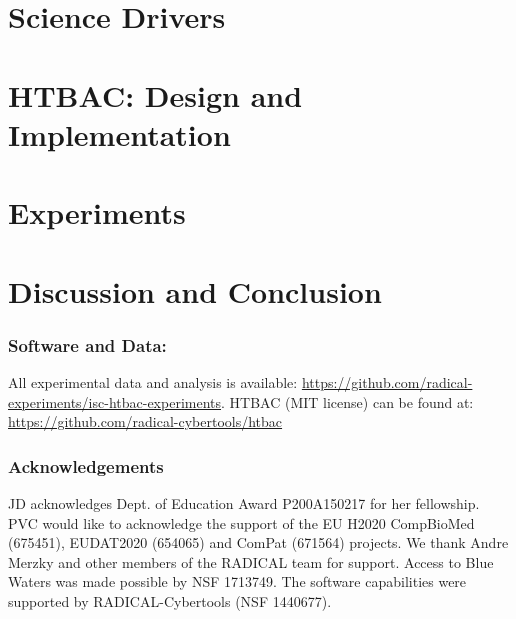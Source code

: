 \documentclass{llncs}
\begin{document}
\section{Science Drivers}
\label{sec:science-drivers}



\section{HTBAC: Design and Implementation}


\vspace{-0.2in}

\section{Experiments}


%

\vspace{-0.2in}

\section{Discussion and Conclusion}


\vspace{-0.2in}

\subsubsection{Software and Data: }
{\footnotesize All experimental data and analysis is available: 
\url{https://github.com/radical-experiments/isc-htbac-experiments}. 
HTBAC (MIT license) can be found at:
\url{https://github.com/radical-cybertools/htbac}}

\vspace{-0.2in}

\subsubsection{Acknowledgements}
%

{\footnotesize JD acknowledges Dept. of Education Award P200A150217 for her fellowship. PVC
would like to acknowledge the support of the EU H2020 CompBioMed (675451),
EUDAT2020 (654065) and ComPat (671564) projects. We thank Andre Merzky and
other members of the RADICAL team for support. Access to Blue Waters was made
possible by NSF 1713749. The software capabilities were supported by
RADICAL-Cybertools (NSF 1440677).}

\newpage



\end{document}
